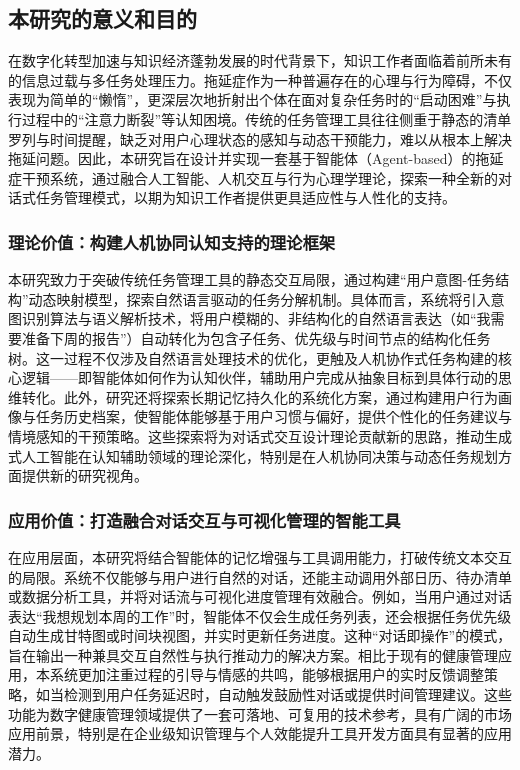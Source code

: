 \subsection{本研究的意义和目的}

\par 在数字化转型加速与知识经济蓬勃发展的时代背景下，知识工作者面临着前所未有的信息过载与多任务处理压力。拖延症作为一种普遍存在的心理与行为障碍，不仅表现为简单的“懒惰”，更深层次地折射出个体在面对复杂任务时的“启动困难”与执行过程中的“注意力断裂”等认知困境。传统的任务管理工具往往侧重于静态的清单罗列与时间提醒，缺乏对用户心理状态的感知与动态干预能力，难以从根本上解决拖延问题。因此，本研究旨在设计并实现一套基于智能体（Agent-based）的拖延症干预系统，通过融合人工智能、人机交互与行为心理学理论，探索一种全新的对话式任务管理模式，以期为知识工作者提供更具适应性与人性化的支持。

\subsubsection{理论价值：构建人机协同认知支持的理论框架}

\par 本研究致力于突破传统任务管理工具的静态交互局限，通过构建“用户意图-任务结构”动态映射模型，探索自然语言驱动的任务分解机制。具体而言，系统将引入意图识别算法与语义解析技术，将用户模糊的、非结构化的自然语言表达（如“我需要准备下周的报告”）自动转化为包含子任务、优先级与时间节点的结构化任务树。这一过程不仅涉及自然语言处理技术的优化，更触及人机协作式任务构建的核心逻辑——即智能体如何作为认知伙伴，辅助用户完成从抽象目标到具体行动的思维转化。此外，研究还将探索长期记忆持久化的系统化方案，通过构建用户行为画像与任务历史档案，使智能体能够基于用户习惯与偏好，提供个性化的任务建议与情境感知的干预策略。这些探索将为对话式交互设计理论贡献新的思路，推动生成式人工智能在认知辅助领域的理论深化，特别是在人机协同决策与动态任务规划方面提供新的研究视角。

\subsubsection{应用价值：打造融合对话交互与可视化管理的智能工具}

\par 在应用层面，本研究将结合智能体的记忆增强与工具调用能力，打破传统文本交互的局限。系统不仅能够与用户进行自然的对话，还能主动调用外部日历、待办清单或数据分析工具，并将对话流与可视化进度管理有效融合。例如，当用户通过对话表达“我想规划本周的工作”时，智能体不仅会生成任务列表，还会根据任务优先级自动生成甘特图或时间块视图，并实时更新任务进度。这种“对话即操作”的模式，旨在输出一种兼具交互自然性与执行推动力的解决方案。相比于现有的健康管理应用，本系统更加注重过程的引导与情感的共鸣，能够根据用户的实时反馈调整策略，如当检测到用户任务延迟时，自动触发鼓励性对话或提供时间管理建议。这些功能为数字健康管理领域提供了一套可落地、可复用的技术参考，具有广阔的市场应用前景，特别是在企业级知识管理与个人效能提升工具开发方面具有显著的应用潜力。

